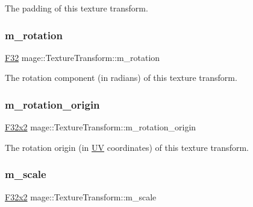 The padding of this texture transform. \hypertarget{classmage_1_1_texture_transform_aa9b56aac4354fa7f37caee42451f60d1}{}\label{classmage_1_1_texture_transform_aa9b56aac4354fa7f37caee42451f60d1} 
\subsubsection{\texorpdfstring{m\+\_\+rotation}{m\_rotation}}
{\footnotesize\ttfamily \hyperlink{namespacemage_aa97e833b45f06d60a0a9c4fc22ae02c0}{F32} mage\+::\+Texture\+Transform\+::m\+\_\+rotation\hspace{0.3cm}{\ttfamily [private]}}

The rotation component (in radians) of this texture transform. \hypertarget{classmage_1_1_texture_transform_af991dbcc669e2af4d78531b50fc60175}{}\label{classmage_1_1_texture_transform_af991dbcc669e2af4d78531b50fc60175} 
\subsubsection{\texorpdfstring{m\+\_\+rotation\+\_\+origin}{m\_rotation\_origin}}
{\footnotesize\ttfamily \hyperlink{namespacemage_aa87237ad091f5cd7da612b8523fc108f}{F32x2} mage\+::\+Texture\+Transform\+::m\+\_\+rotation\+\_\+origin\hspace{0.3cm}{\ttfamily [private]}}

The rotation origin (in \hyperlink{structmage_1_1_u_v}{UV} coordinates) of this texture transform. \hypertarget{classmage_1_1_texture_transform_adb36217d25494721ee54cd6807ea65af}{}\label{classmage_1_1_texture_transform_adb36217d25494721ee54cd6807ea65af} 
\subsubsection{\texorpdfstring{m\+\_\+scale}{m\_scale}}
{\footnotesize\ttfamily \hyperlink{namespacemage_aa87237ad091f5cd7da612b8523fc108f}{F32x2} mage\+::\+Texture\+Transform\+::m\+\_\+scale\hspace{0.3cm}{\ttfamily [private]}}

